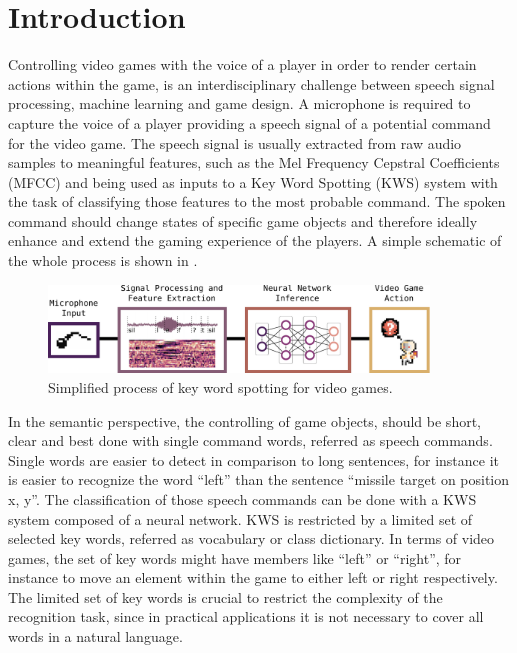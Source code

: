 
\chapter{Introduction}\label{sec:intro}
Controlling video games with the voice of a player in order to render certain actions within the game, is an interdisciplinary challenge between speech signal processing, machine learning and game design.
A microphone is required to capture the voice of a player providing a speech signal of a potential command for the video game.
The speech signal is usually extracted from raw audio samples to meaningful features, such as the Mel Frequency Cepstral Coefficients (MFCC) and being used as inputs to a Key Word Spotting (KWS) system with the task of classifying those features to the most probable command.
The spoken command should change states of specific game objects and therefore ideally enhance and extend the gaming experience of the players.
A simple schematic of the whole process is shown in .
\begin{figure}[!ht]
  \centering
    \includegraphics[width=0.9\textwidth]{./1_intro/figs/intro_kws}
  \caption{Simplified process of key word spotting for video games.}
  \label{fig:intro_kws}
\end{figure}
\FloatBarrier
\noindent
In the semantic perspective, the controlling of game objects, should be short, clear and best done with single command words, referred as speech commands.
Single words are easier to detect in comparison to long sentences, for instance it is easier to recognize the word \enquote{left} than the sentence \enquote{missile target on position x, y}.
The classification of those speech commands can be done with a KWS system composed of a neural network.
KWS is restricted by a limited set of selected key words, referred as vocabulary or class dictionary.
In terms of video games, the set of key words might have members like \enquote{left} or \enquote{right}, for instance to move an element within the game to either left or right respectively.
The limited set of key words is crucial to restrict the complexity of the recognition task, since in practical applications it is not necessary to cover all words in a natural language.
